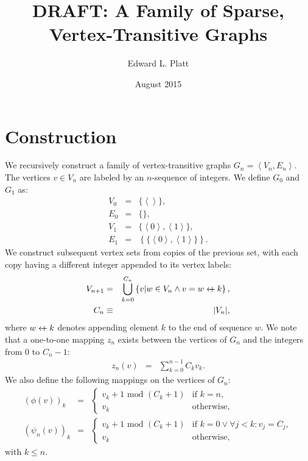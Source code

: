 \documentclass{article}
\title{DRAFT: A Family of Sparse, Vertex-Transitive Graphs}
\author{Edward L. Platt}
\date{August 2015}
\newcommand{\la}{\left\langle}
\newcommand{\ra}{\right\rangle}
\newcommand{\beq}{\begin{eqnarray}}
\newcommand{\eeq}{\end{eqnarray}}
\newcommand{\append}{\leftarrow{\mkern-18mu}{+}\:}
\begin{document}
\maketitle

\section{Construction}

We recursively construct a family of vertex-transitive graphs
$G_n = \la V_n, E_n \ra$.
The vertices $v \in V_n$ are labeled by an $n$-sequence of integers.
We define $G_0$ and $G_1$ as:
\beq
V_0 &=& \{ \la\ra \}, \\
E_0 &=& \{ \}, \\
V_1 &=& \{\la{0}\ra,\la{1}\ra\}, \\
E_1 &=& \left\{\{\la{0}\ra,\la{1}\ra\}\right\}.
\eeq
We construct subsequent vertex sets from copies of the previous set,
with each copy having a different integer appended to its vertex labels:
\beq
\label{eq:vn}
V_{n+1} &=& \bigcup_{k = 0}^{C_n}
\left\{ v | w \in V_n \land v = w \append k \right\},
\\
C_n &\equiv& |V_n|,
\eeq
where $w \append k$ denotes appending element $k$ to the end of sequence $w$.
We note that a one-to-one mapping $z_n$ exists between the vertices of $G_n$ and the
integers from $0$ to $C_n - 1$:
\beq
z_n(v) &=& \sum_{k=0}^{n-1} C_k v_k.
\eeq
We also define the following mappings on the vertices of $G_n$:
\beq
(\phi(v))_k
&=&
\begin{cases}
v_k + 1 \mbox{ mod } (C_k + 1) & \mbox{if } k = n,
\\
v_k & \mbox{otherwise},
\end{cases}
\\
(\psi_n(v))_k
&=&
\begin{cases}
v_k + 1 \mbox{ mod } (C_k + 1)
& \mbox{if } k = 0 \lor \forall j < k: v_j = C_j, \\
v_k & \mbox{otherwise},
\end{cases}
\eeq
with $k \leq n$.
\end{document}

